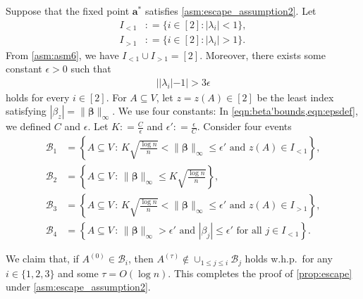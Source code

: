 \documentclass[letterpaper,11pt]{article}
\def\defeq{\mathrel{\mathop:}=}%
\begin{document}
Suppose that the fixed point $\mathbf{a}^*$ satisfies \cref{asm:escape_assumption2}.
Let
\begin{align*}
I_{<1}&\defeq\{i\in[2]:|\lambda_i|<1\}, \\
I_{>1}&\defeq\{i\in[2]:|\lambda_i|>1\}.
\end{align*}
From \ref{asm:asm6}, we have $I_{<1}\cup I_{>1}=[2]$.
Moreover, there exists some constant $\epsilon>0$ such that
\begin{align}
||\lambda_i|-1| > 3\epsilon \label{eqn:epsdef}
\end{align}
holds for every $i\in [2]$.
For $A\subseteq V$, let $z=z(A)\in[2]$ be the least index satisfying $|\beta_z|=\|{\boldsymbol \beta}\|_\infty$.
We use four constants: In \cref{eqn:beta'bounds,eqn:epsdef}, we defined $C$ and $\epsilon$.
Let $K\defeq\frac{C}{\epsilon}$ and $\epsilon'\defeq \frac{\epsilon}{C}$.
Consider four events
\begin{align*}
\mathcal{B}_1&=\left\{A\subseteq V\,:\, K\sqrt{\frac{\log n}{n}}<\|{\boldsymbol \beta}\|_\infty \leq \epsilon' \text{ and }z(A)\in I_{<1} \right\},\\
\mathcal{B}_2&=\left\{A\subseteq V\,:\, \|{\boldsymbol \beta}\|_\infty \leq K\sqrt{\frac{\log n}{n}} \right\}, \\
\mathcal{B}_3&=\left\{A\subseteq V\,:\, K\sqrt{\frac{\log n}{n}}<\|{\boldsymbol \beta}\|_\infty \leq \epsilon' \text{ and }z(A)\in I_{>1} \right\}, \\
\mathcal{B}_4&=\left\{A\subseteq V\,:\, \|{\boldsymbol \beta}\|_\infty > \epsilon' \text{ and } |\beta_j|\leq \epsilon'\text{ for all }j\in I_{<1} \right\}.
\end{align*}

We claim that, if $A^{(0)}\in \mathcal{B}_i$, then $A^{(\tau)}\not \in  \cup_{1\leq j\leq i}\mathcal{B}_{j}$ holds w.h.p.~for any $i\in\{1,2,3\}$ and some $\tau=O(\log n)$.
This completes the proof of \cref{prop:escape} under \cref{asm:escape_assumption2}.
\end{document}
